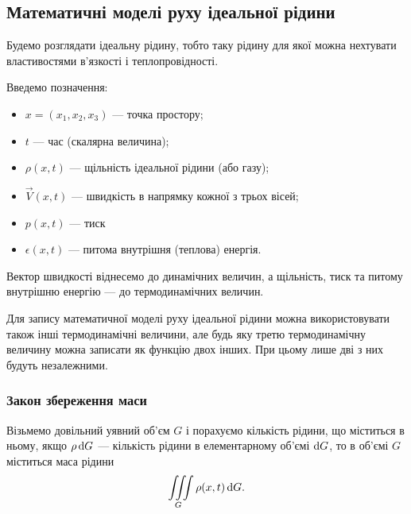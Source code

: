 % 


% 

% 



\subsection{Математичні моделі руху ідеальної рідини}

Будемо розглядати ідеальну рідину, тобто таку рідину для якої можна нехтувати властивостями в'язкості і теплопровідності. \medskip

Введемо позначення:
\begin{itemize}
	\item $x = (x_1, x_2, x_3)$ --- точка простору;
	\item $t$ --- час (скалярна величина);
	\item $\rho(x, t)$ --- щільність ідеальної рідини (або газу);
	\item $\vec V(x, t)$ --- швидкість в напрямку кожної з трьох вісей;
	\item $p(x, t)$ --- тиск 
	\item $\epsilon(x, t)$ --- питома внутрішня (теплова) енергія.
\end{itemize}

Вектор швидкості віднесемо до динамічних величин, а щільність, тиск та питому внутрішню енергію --- до термодинамічних величин. \medskip

Для запису математичної моделі руху ідеальної рідини можна використовувати також інші термодинамічні величини, але будь яку третю термодинамічну величину можна записати як функцію двох інших. При цьому лише дві з них будуть незалежними. 

\subsubsection{Закон збереження маси}

Візьмемо довільний уявний об'єм $G$ і порахуємо кількість рідини, що міститься в ньому, якщо $\rho \mathop{}\!\mathrm{d} G$ --- кількість рідини в елементарному об'ємі $\mathop{}\!\mathrm{d} G$, то в об'ємі $G$ міститься маса рідини
\begin{equation}
	\displaystyle\iiint\limits_G \rho(x, t) \mathop{}\!\mathrm{d} G.
\end{equation}

